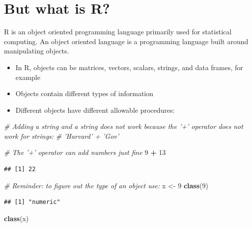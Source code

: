 \documentclass[]{book}
\newenvironment{Shaded}{\begin{snugshade}}{\end{snugshade}}
\newcommand{\CommentTok}[1]{\textcolor[rgb]{0.56,0.35,0.01}{\textit{#1}}}
\newcommand{\DecValTok}[1]{\textcolor[rgb]{0.00,0.00,0.81}{#1}}
\newcommand{\KeywordTok}[1]{\textcolor[rgb]{0.13,0.29,0.53}{\textbf{#1}}}
\newcommand{\NormalTok}[1]{#1}
\newcommand{\OperatorTok}[1]{\textcolor[rgb]{0.81,0.36,0.00}{\textbf{#1}}}
\newcommand{\StringTok}[1]{\textcolor[rgb]{0.31,0.60,0.02}{#1}}
\providecommand{\tightlist}{%
  \setlength{\itemsep}{0pt}\setlength{\parskip}{0pt}}
\theoremstyle{definition}
\theoremstyle{definition}
\theoremstyle{definition}
\theoremstyle{remark}
\begin{document}
\hypertarget{but-what-is-r}{%
\section{But what is R?}\label{but-what-is-r}}

R is an object oriented programming language primarily used for statistical computing. An object oriented language is a programming language built around manipulating objects.

\begin{itemize}
\tightlist
\item
  In R, objects can be matrices, vectors, scalars, strings, and data frames, for example
\item
  Objects contain different types of information
\item
  Different objects have different allowable procedures:
\end{itemize}

\begin{Shaded}
\begin{Highlighting}[]
\CommentTok{# Adding a string and a string does not work because the '+' operator does not work for strings:}
\CommentTok{# 'Harvard' + 'Gov'}

\CommentTok{# The '+' operator can add numbers just fine}
\DecValTok{9} \OperatorTok{+}\StringTok{ }\DecValTok{13}
\end{Highlighting}
\end{Shaded}

\begin{verbatim}
## [1] 22
\end{verbatim}

\begin{Shaded}
\begin{Highlighting}[]
\CommentTok{# Reminder: to figure out the type of an object use:}
\NormalTok{x <-}\StringTok{ }\DecValTok{9}
\KeywordTok{class}\NormalTok{(}\DecValTok{9}\NormalTok{)}
\end{Highlighting}
\end{Shaded}

\begin{verbatim}
## [1] "numeric"
\end{verbatim}

\begin{Shaded}
\begin{Highlighting}[]
\KeywordTok{class}\NormalTok{(x)}
\end{Highlighting}
\end{Shaded}
\end{document}

